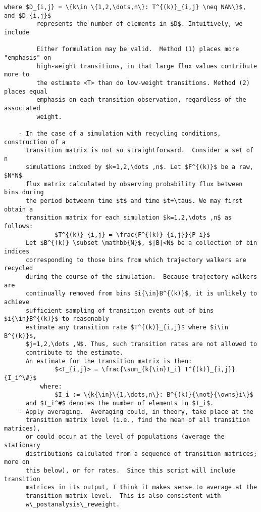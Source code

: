 \documentclass[10pt]{article}
\begin{document}
\begin{Verbatim}[commandchars=\\\{\},codes={\catcode`$=3\catcode`^=7\catcode`_=8}]
         where $D_{i,j} = \{k\in \{1,2,\dots,n\}: T^{(k)}_{i,j} \neq NAN\}$, and $D_{i,j}$
         represents the number of elements in $D$. Intuitively, we include 

         Either formulation may be valid.  Method (1) places more "emphasis" on 
         high-weight transitions, in that large flux values contribute more to 
         the estimate <T> than do low-weight transitions. Method (2) places equal
         emphasis on each transition observation, regardless of the associated
         weight.

    - In the case of a simulation with recycling conditions, construction of a 
      transition matrix is not so straightforward.  Consider a set of n
      simulations indxed by $k=1,2,\dots ,n$. Let $F^{(k)}$ be a raw, $N*N$ 
      flux matrix calculated by observing probability flux between bins during 
      the period betweenn time $t$ and time $t+\tau$. We may first obtain a
      transition matrix for each simulation $k=1,2,\dots ,n$ as follows: 
              $T^{(k)}_{i,j} = \frac{F^{(k)}_{i,j}}{P_i}$
      Let $B^{(k)} \subset \mathbb{N}$, $|B|<N$ be a collection of bin indices 
      corresponding to those bins from which trajectory walkers are recycled 
      during the course of the simulation.  Because trajectory walkers are 
      continually removed from bins $i{\in}B^{(k)}$, it is unlikely to achieve 
      sufficient sampling of transition events out of bins $i{\in}B^{(k)}$ to reasonably 
      estimate any transition rate $T^{(k)}_{i,j}$ where $i\in B^{(k)}$, 
      $j=1,2,\dots ,N$. Thus, such transition rates are not allowed to
      contribute to the estimate.
      An estimate for the transition matrix is then:
              $<T_{i,j}> = \frac{\sum_{k{\in}I_i} T^{(k)}_{i,j}}{I_i^\#}$ 
          where:
              $I_i := \{k{\in}\{1,\dots,n\}: B^{(k)}{\not}{\owns}i\}$
      and $I_i^#$ denotes the number of elements in $I_i$.
    - Apply averaging.  Averaging could, in theory, take place at the
      transition matrix level (i.e., find the mean of all transition matrices),
      or could occur at the level of populations (average the stationary
      distributions calculated from a sequence of transition matrices; more on 
      this below), or for rates.  Since this script will include transition 
      matrices in its output, I think it makes sense to average at the
      transition matrix level.  This is also consistent with 
      w\_postanalysis\_reweight.


\end{Verbatim}
\end{document}
